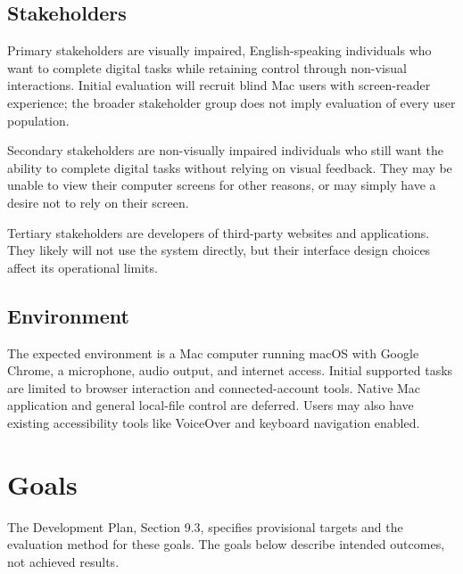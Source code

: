 \documentclass[11pt]{article}
\begin{document}
\subsection{Stakeholders}
\begin{description}[style=nextline]
\item[Visually impaired individuals]
Primary stakeholders are visually impaired, English-speaking individuals who want to complete digital
tasks while retaining control through non-visual interactions. Initial evaluation
will recruit blind Mac users with screen-reader experience; the broader
stakeholder group does not imply evaluation of every user population.
\item[Users Wanting Non-Visual Interactions]
Secondary stakeholders are non-visually impaired individuals who still want the ability to complete
digital tasks without relying on visual feedback. They may be unable to view their computer screens
for other reasons, or may simply have a desire not to rely on their screen.
\item[Website and Application Developers]
Tertiary stakeholders are developers of third-party websites and applications. They likely will not use
the system directly, but their interface design choices affect its operational limits.
\end{description}

\subsection{Environment}
The expected environment is a Mac computer running macOS with Google Chrome,
a microphone, audio output, and internet access. Initial supported tasks are
limited to browser interaction and connected-account tools. Native Mac application
and general local-file control are deferred. Users may also have existing
accessibility tools like VoiceOver and keyboard navigation enabled.

\section{Goals}
The Development Plan, Section 9.3, specifies provisional targets and the
evaluation method for these goals. The goals below describe intended outcomes,
not achieved results.
\end{document}
